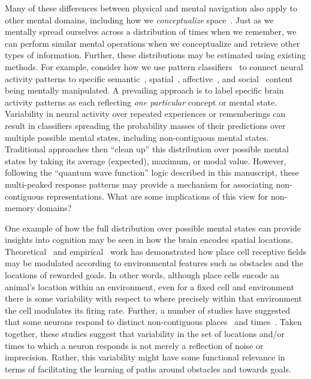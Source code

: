 \documentclass{article}
\begin{document}
Many of these differences between physical and mental navigation also apply to other mental domains, including how we \textit{conceptualize} space~\citep[e.g., when we trace out a potential route in our mind;][]{GautvanW16, GautEtal18, ArzyScha19}.  Just as we mentally spread ourselves across a distribution of times when we remember, we can perform similar mental operations when we conceptualize and retrieve other types of information.  Further, these distributions may be estimated using existing methods.  For example, consider how we use pattern classifiers~\citep{NormEtal06b} to connect neural activity patterns to specific semantic~\citep{PolyEtal05a, MitcEtal08a, MannEtal12}, spatial~\citep{MillEtal13}, affective~\citep{ChanEtal18}, and social~\citep{MeyeEtal18} content being mentally manipulated.  A prevailing approach is to label specific brain activity patterns as each reflecting \textit{one particular} concept or mental state.  Variability in neural activity over repeated experiences or rememberings can result in classifiers spreading the probability masses of their predictions over multiple possible mental states, including non-contiguous mental states.  Traditional approaches then ``clean up'' this distribution over possible mental states by taking its average (expected), maximum, or modal value.  However, following the ``quantum wave function'' logic described in this manuscript, these multi-peaked response patterns may provide a mechanism for associating non-contiguous representations.  What are some implications of this view for non-memory domains?

One example of how the full distribution over possible mental states can provide insights into cognition may be seen in how the brain encodes spatial locations.  Theoretical~\citep[e.g., ][]{GersAbbo97} and empirical~\citep[e.g., ][]{PfeiFost13} work has demonstrated how place cell receptive fields may be modulated according to environmental features such as obstacles and the locations of rewarded goals.  In other words, although place cells encode an animal's location within an environment, even for a fixed cell and environment there is some variability with respect to where precisely within that environment the cell modulates its firing rate.  Further, a number of studies have suggested that some neurons respond to distinct non-contiguous places~\citep{FentEtal08, RichEtal14b, LeeEtal19, DerdEtal09, GrieEtal20} and times~\citep{PastEtal08}.  Taken together, these studies suggest that variability in the set of locations and/or times to which a neuron responds is not merely a reflection of noise or imprecision.  Rather, this variability might have some functional relevance in terms of facilitating the learning of paths around obstacles and towards goals.
\end{document}
